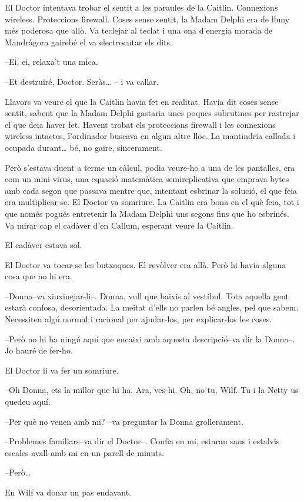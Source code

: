 El Doctor intentava trobar el sentit a les paraules de la Caitlin.
Connexions wireless. Proteccions firewall. Coses sense sentit, la Madam
Delphi era de lluny més poderosa que allò. Va teclejar al teclat i una
ona d'energia morada de Mandràgora gairebé el va electrocutar els dits.

--Ei, ei, relaxa't una mica.

--Et destruiré, Doctor. Seràs\ldots{} -- i va callar.

Llavors va veure el que la Caitlin havia fet en realitat. Havia dit
coses sense sentit, sabent que la Madam Delphi gastaria unes poques
subrutines per rastrejar el que deia haver fet. Havent trobat els
proteccions firewall i les connexions wireless intactes, l'ordinador
buscava en algun altre lloc. La mantindria callada i ocupada
durant\ldots{} bé, no gaire, sincerament.

Però s'estava duent a terme un càlcul, podia veure-ho a una de les
pantalles, era com un mini-virus, una equació matemàtica semireplicativa
que emprava bytes amb cada segon que passava mentre que, intentant
esbrinar la solució, el que feia era multiplicar-se. El Doctor va
somriure. La Caitlin era bona en el què feia, tot i que només pogués
entretenir la Madam Delphi uns segons fins que ho esbrinés. Va mirar cap
el cadàver d'en Callum, esperant veure la Caitlin.

El cadàver estava sol.

El Doctor va tocar-se les butxaques. El revòlver era allà. Però hi havia
alguna cosa que no hi era.

--Donna--va xiuxiuejar-li--. Donna, vull que baixis al vestíbul. Tota
aquella gent estarà confosa, desorientada. La meitat d'ells no parlen bé
angles, pel que sabem. Necessiten algú normal i racional per ajudar-los,
per explicar-los les coses.

--Però no hi ha ningú aquí que encaixi amb aquesta descripció--va dir la
Donna--. Jo hauré de fer-ho.

El Doctor li va fer un somriure.

--Oh Donna, ets la millor que hi ha. Ara, ves-hi. Oh, no tu, Wilf. Tu i
la Netty us quedeu aquí.

--Per què no venen amb mi? --va preguntar la Donna grollerament.

--Problemes familiars--va dir el Doctor--. Confia en mi, estaran sans i
estalvis escales avall amb mi en un parell de minuts.

--Però\ldots{}

En Wilf va donar un pas endavant.

